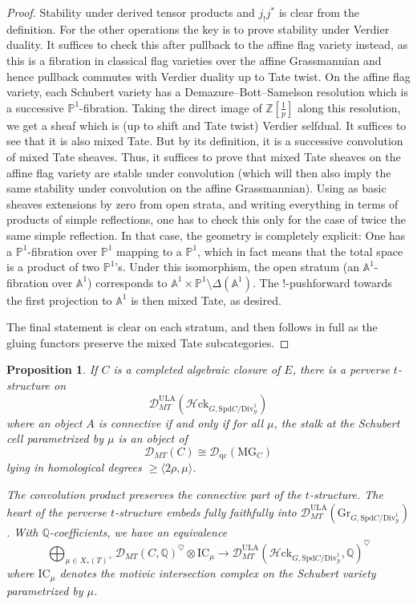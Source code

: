 \documentclass[11pt]{amsart}
\numberwithin{equation}{section}
\numberwithin{theorem}{section}
\newtheorem{proposition}[theorem]{Proposition}
\theoremstyle{definition}
\newcommand{\Hloc}{{\mathcal H}{\mathrm{ck}}}
\begin{document}
\begin{proof} Stability under derived tensor products and $j_! j^\ast$ is clear from the definition. For the other operations the key is to prove stability under Verdier duality. It suffices to check this after pullback to the affine flag variety instead, as this is a fibration in classical flag varieties over the affine Grassmannian and hence pullback commutes with Verdier duality up to Tate twist. On the affine flag variety, each Schubert variety has a Demazure--Bott--Samelson resolution which is a successive $\mathbb P^1$-fibration. Taking the direct image of $\mathbb Z[\tfrac 1p]$ along this resolution, we get a sheaf which is (up to shift and Tate twist) Verdier selfdual. It suffices to see that it is also mixed Tate. But by its definition, it is a successive convolution of mixed Tate sheaves. Thus, it suffices to prove that mixed Tate sheaves on the affine flag variety are stable under convolution (which will then also imply the same stability under convolution on the affine Grassmannian). Using as basic sheaves extensions by zero from open strata, and writing everything in terms of products of simple reflections, one has to check this only for the case of twice the same simple reflection. In that case, the geometry is completely explicit: One has a $\mathbb P^1$-fibration over $\mathbb P^1$ mapping to a $\mathbb P^1$, which in fact means that the total space is a product of two $\mathbb P^1$'s. Under this isomorphism, the open stratum (an $\mathbb A^1$-fibration over $\mathbb A^1$) corresponds to $\mathbb A^1\times \mathbb P^1\setminus \Delta(\mathbb A^1)$. The $!$-pushforward towards the first projection to $\mathbb A^1$ is then mixed Tate, as desired.

The final statement is clear on each stratum, and then follows in full as the gluing functors preserve the mixed Tate subcategories.
\end{proof}

\begin{proposition} If $C$ is a completed algebraic closure of $E$, there is a perverse $t$-structure on
\[
\mathcal D_{MT}^{\mathrm{ULA}}(\Hloc_{G,\mathrm{Spd} C/\mathrm{Div}^1_{\mathcal Y}})
\]
where an object $A$ is connective if and only if for all $\mu$, the stalk at the Schubert cell parametrized by $\mu$ is an object of
\[
\mathcal D_{MT}(C)\cong \mathcal D_{\mathrm{qc}}(\mathrm{MG}_C)
\]
lying in homological degrees $\geq \langle 2\rho,\mu\rangle$.

The convolution product preserves the connective part of the $t$-structure. The heart of the perverse $t$-structure embeds fully faithfully into $\mathcal D_{MT}^{\mathrm{ULA}}(\mathrm{Gr}_{G,\mathrm{Spd} C/\mathrm{Div}^1_{\mathcal Y}})$. With $\mathbb Q$-coefficients, we have an equivalence
\[
\bigoplus_{\mu\in X_\ast(T)^+} \mathcal D_{MT}(C,\mathbb Q)^\heartsuit\otimes \mathrm{IC}_\mu\to \mathcal D_{MT}^{\mathrm{ULA}}(\Hloc_{G,\mathrm{Spd} C/\mathrm{Div}^1_{\mathcal Y}},\mathbb Q)^\heartsuit
\]
where $\mathrm{IC}_\mu$ denotes the motivic intersection complex on the Schubert variety parametrized by $\mu$.
\end{proposition}
\end{document}
